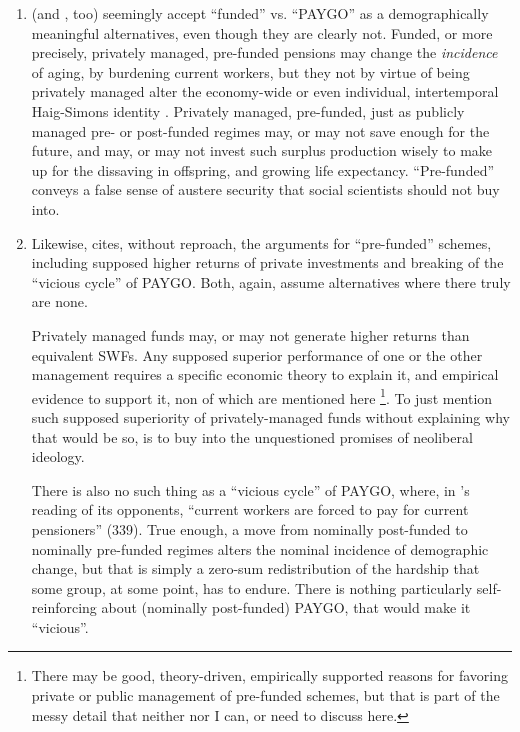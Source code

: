 \documentclass[11pt,a4paper,oneside,openright]{article}
\begin{document}
\begin{enumerate}
	\item \citeauthor{Cerami2009a} (and \citealt{Bastian1998}, too) seemingly accept ``funded'' vs. ``PAYGO'' as a demographically meaningful alternatives, even though they are clearly not. 
	Funded, or more precisely, privately managed, pre-funded pensions may change the \emph{incidence} of aging, by burdening current workers, but they not by virtue of being privately managed alter the economy-wide or even individual, intertemporal Haig-Simons identity \citep[for a detailed model, see][170]{Borsch-Supan2003}. 
	Privately managed, pre-funded, just as publicly managed pre- or post-funded regimes may, or may not save enough for the future, and may, or may not invest such surplus production wisely to make up for the dissaving in offspring, and growing life expectancy. 
	``Pre-funded'' conveys a false sense of austere security that social scientists should not buy into.
	
	\item Likewise, \citeauthor{Cerami2009a} cites, without reproach, the arguments for ``pre-funded'' schemes, including supposed higher returns of private investments and breaking of the ``vicious cycle'' of PAYGO. 
	Both, again, assume alternatives where there truly are none. 
	
	Privately managed funds may, or may not generate higher returns than equivalent \glspl{SWF}. 
	Any supposed superior performance of one or the other management requires a specific economic theory to explain it, and empirical evidence to support it, non of which are mentioned here
	\footnote{
		There may be good, theory-driven, empirically supported reasons for favoring private or public management of pre-funded schemes, but that is part of the messy detail that neither \citeauthor{Cerami2009a} nor I can, or need to discuss here.
	}.
	To just mention such supposed superiority of privately-managed funds without explaining why that would be so, is to buy into the unquestioned promises of neoliberal ideology.
	
	There is also no such thing as a ``vicious cycle'' of PAYGO, where, in \citeauthor{Cerami2009a}'s reading of its opponents, ``current workers are forced to pay for current pensioners'' (339). 
	True enough, a move from nominally post-funded to nominally pre-funded regimes alters the nominal incidence of demographic change, but that is simply a zero-sum redistribution of the hardship that some group, at some point, has to endure. 
	There is nothing particularly self-reinforcing about (nominally post-funded) PAYGO, that would make it ``vicious''. 
	

\end{enumerate}
\end{document}
